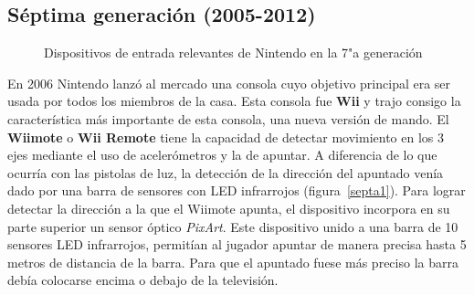 
\subsection{S\'eptima generaci\'on (2005-2012)}

\begin{figure}[t]
     \hfill
{}
     \caption{Dispositivos de entrada relevantes de Nintendo en la 7"a  generaci\'on}
     \label{fig:septima}
   \end{figure}

En 2006 Nintendo lanz\'o al mercado una consola cuyo objetivo principal era ser usada por todos los miembros de la casa. Esta consola fue \textbf{Wii} y trajo consigo la caracter\'istica m\'as importante de esta consola, una nueva versi\'on de mando. El \textbf{Wiimote} o \textbf{Wii Remote} tiene la capacidad de detectar movimiento en los 3 ejes mediante el uso de aceler\'ometros y la de apuntar. A diferencia de lo que ocurr\'ia con las pistolas de luz, la detecci\'on de la direcci\'on del apuntado ven\'ia dado por una barra de sensores con LED infrarrojos (figura~\ref{septa1}). Para lograr detectar la direcci\'on a la que el Wiimote apunta, el dispositivo incorpora en su parte superior un sensor \'optico \textit{PixArt}. Este dispositivo unido a una barra de 10 sensores LED infrarrojos, permit\'ian al jugador apuntar de manera precisa hasta 5 metros de distancia de la barra. Para que el apuntado fuese m\'as preciso la barra deb\'ia colocarse encima o debajo de la televisi\'on.\\

